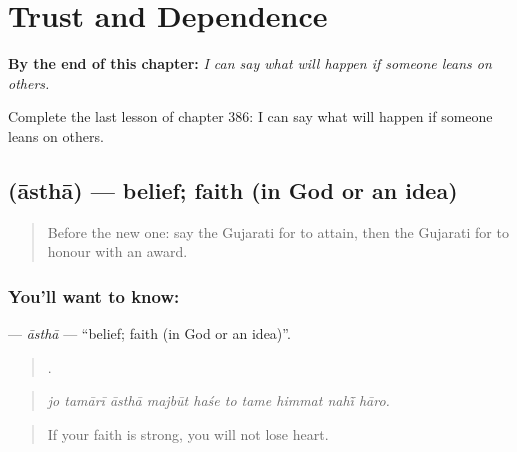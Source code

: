 
\chapter{Trust and Dependence}
\label{ch:gu-trust-and-dependence}

\begin{chapteropening}
\textbf{By the end of this chapter:} \emph{I can say what will happen if someone leans on others.}

Complete the last lesson of chapter 386: I can say what will happen if someone leans on others.
\end{chapteropening}

\section[\texorpdfstring{\gu{આસ્થા} (āsthā)}{આસ્થા (āsthā)}]{ (āsthā) — belief; faith (in God or an idea)}

\label{lesson:GU-C386-astha}



\begin{quote}
Before the new one: say the Gujarati for to attain, then the Gujarati for to honour with an award.
\end{quote}

\subsection*{You'll want to know: }
\textbf{} — \emph{āsthā} — \textquotedblleft{}belief; faith (in God or an idea)\textquotedblright{}.

\begin{quote}
         .
\end{quote}

\begin{quote}
\emph{jo tamārī āsthā majbūt haśe to tame himmat nahī̃ hāro.}
\end{quote}

\begin{quote}
If your faith is strong, you will not lose heart.
\end{quote}

